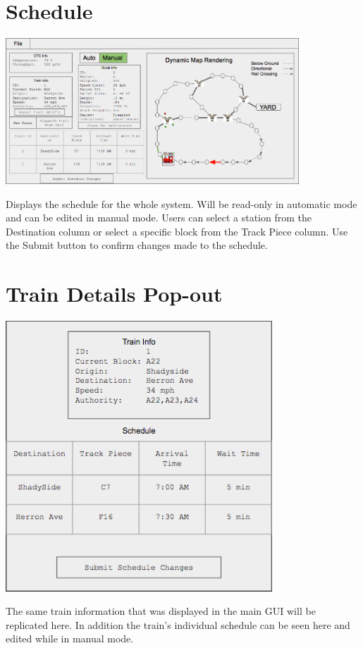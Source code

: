 \documentclass{scrreprt}
\begin{document}
\section{Schedule}
\begin{center}
  \includegraphics[trim={.45cm .08cm 18.7cm 11.15cm},clip,width=11cm]{CTC-main}
\end{center}
Displays the schedule for the whole system. Will be read-only in automatic mode and can be
edited in manual mode. Users can select a station from the Destination column or select a specific
block from the Track Piece column. Use the Submit button to confirm changes made to the schedule.

\section{Train Details Pop-out}
\begin{center}
  \includegraphics[width=10cm]{CTC-pop}
\end{center}
The same train information that was displayed in the main GUI will be replicated here. In
addition the train's individual schedule can be seen here and edited while in manual mode.
\end{document}
